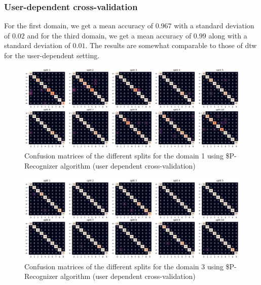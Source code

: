 \subsubsection{User-dependent cross-validation}

For the first domain, we get a mean accuracy of $0.967$ with a standard deviation of $0.02$ and for the third domain, we get a mean accuracy of $0.99$ along with a standard deviation of $0.01$. The results are somewhat comparable to those of dtw for the user-dependent setting.

\begin{figure}[H]
	\centering
	\includegraphics{figures/pcr/domain01/cm_pcr_d1_udep.png}
	\caption{Confusion matrices of the different splits for the domain 1 using \$P-Recognizer algorithm (user dependent cross-validation)}
	\label{fig:cm-pcr-d1-udep}
\end{figure}

\begin{figure}[H]
	\centering
	\includegraphics{figures/pcr/domain03/cm_pcr_d3_udep.png}
	\caption{Confusion matrices of the different splits for the domain 3 using \$P-Recognizer algorithm (user dependent cross-validation)}
	\label{fig:cm-pcr-d3-udep}
\end{figure}